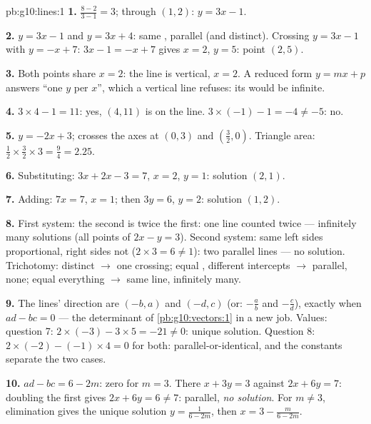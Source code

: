 \begin{solution}{pb:g10:lines:1}
\textbf{1.}  $\frac{8 - 2}{3 - 1} = 3$; through $(1, 2)$:
$y = 3x - 1$.

\textbf{2.} $y = 3x - 1$ and $y = 3x + 4$: same , parallel
(and distinct). Crossing $y = 3x - 1$ with $y = -x + 7$:
$3x - 1 = -x + 7$ gives $x = 2$, $y = 5$: point $(2, 5)$.

\textbf{3.} Both points share $x = 2$: the line is vertical,
 $x = 2$. A reduced form $y = mx + p$ answers ``one $y$
per $x$'', which a vertical line refuses: its  would be
infinite.

\textbf{4.} $3 \times 4 - 1 = 11$: yes, $(4, 11)$ is on the
line. $3 \times (-1) - 1 = -4 \neq -5$: no.

\textbf{5.} $y = -2x + 3$; crosses the axes at $(0, 3)$ and
$\left(\frac32, 0\right)$. Triangle area:
$\frac12 \times \frac32 \times 3 = \frac94 = 2.25$.

\textbf{6.} Substituting: $3x + 2x - 3 = 7$, $x = 2$,
$y = 1$: solution $(2, 1)$.

\textbf{7.} Adding: $7x = 7$, $x = 1$; then $3y = 6$, $y = 2$:
solution $(1, 2)$.

\textbf{8.} First system: the second  is twice the
first: one line counted twice --- infinitely many solutions
(all points of $2x - y = 3$). Second system: same left sides
proportional, right sides not ($2 \times 3 = 6 \neq 1$): two
parallel lines --- no solution. Trichotomy: distinct 
$\to$ one crossing; equal , different intercepts $\to$
parallel, none; equal everything $\to$ same line, infinitely
many.

\textbf{9.} The lines' direction  are $(-b, a)$ and
$(-d, c)$ (or:  $-\frac ab$ and $-\frac cd$), 
exactly when $ad - bc = 0$ --- the determinant of
\cref{pb:g10:vectors:1} in a new job. Values: question 7:
$2 \times (-3) - 3 \times 5 = -21 \neq 0$: unique solution.
Question 8: $2 \times (-2) - (-1) \times 4 = 0$ for both:
parallel-or-identical, and the constants separate the two
cases.

\textbf{10.} $ad - bc = 6 - 2m$: zero for $m = 3$. There
$x + 3y = 3$ against $2x + 6y = 7$: doubling the first gives
$2x + 6y = 6 \neq 7$: parallel, \emph{no solution}. For
$m \neq 3$, elimination gives the unique solution
$y = \frac{1}{6 - 2m}$, then $x = 3 - \frac{m}{6 - 2m}$.


\end{solution}

